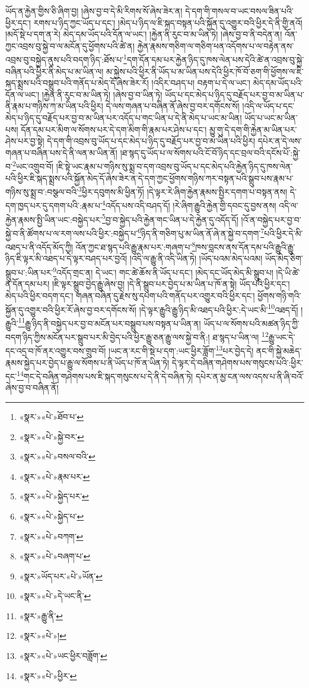 ཡོད་ན་རྐྱེན་གྱིས་ཅི་ཞིག་བྱ། །ཞེས་བྱ་བ་དེ་མི་རིགས་སོ་ཞེས་ཟེར་ན། དེ་དག་གི་གསལ་བ་ཡང་བསལ་ཟིན་པའི་ཕྱིར་དང་། རགས་པ་ཉིད་ཀྱང་ཡོད་པ་དང་། །མེད་པ་ཉིད་ལ་ཇི་སྐད་བསྟན་པའི་སྐྱོན་དུ་འགྱུར་བའི་ཕྱིར་དེ་ནི་གྱི་ནའོ། །མདོ་སྡེ་པ་དག་ན་རེ། མེད་དམ་ཡོད་པའི་དོན་ལ་ཡང་། །རྐྱེན་ནི་རུང་བ་མ་ཡིན་ཏེ། །ཞེས་བྱ་བ་ནི་བདེན་ན། འོན་ཀྱང་འབྲས་བུ་སྐྱེ་བ་ལ་མངོན་དུ་ཕྱོགས་པའི་ཚེ་ན། རྐྱེན་རྣམས་གཅིག་ལ་གཅིག་ཕན་འདོགས་པ་ལ་བརྟེན་ནས་འབྲས་བུ་བསྐྱེད་ནུས་པའི་བདག་ཉིད་:ཐོས་པ་\footnote{«སྣར་»«པེ་»ཐོབ་པ་}དག་དོན་དམ་པར་རྐྱེན་ཉིད་དུ་ཁས་ལེན་པས་དེའི་ཚེ་ན་འབྲས་བུ་སྐྱེ་བཞིན་པའི་ཕྱིར་ནི་མེད་པ་མ་ཡིན་ལ། མ་སྐྱེས་པའི་ཕྱིར་ནི་ཡོད་པ་མ་ཡིན་པས་དེའི་ཕྱིར་ཁོ་བོ་ཅག་གི་ཕྱོགས་ལ་ཇི་སྐད་སྨྲས་པའི་བསྒྲུབ་པའི་གནོད་པ་མེད་དོ་ཞེས་ཟེར་རོ། །འདིར་བཤད་པ། བརྟག་པ་དེ་ལ་ཡང་། མེད་དམ་ཡོད་པའི་དོན་ལ་ཡང་། །རྐྱེན་ནི་རུང་བ་མ་ཡིན་ཏེ། །ཞེས་བྱ་བ་ཡིན་ཏེ། ཡོད་པ་དང་མེད་པ་ཉིད་དུ་བརྗོད་པར་བྱ་བ་མ་ཡིན་པ་ནི་རྣམ་པ་གཉིས་ཀ་མ་ཡིན་པའི་ཕྱིར། དེ་ལས་གཞན་པ་བཞིན་ནོ་ཞེས་བྱ་བར་དགོངས་སོ། །འདི་ལ་ཡོད་པ་དང་མེད་པ་ཉིད་དུ་བརྗོད་པར་བྱ་བ་མ་ཡིན་པར་འདོད་པ་གང་ཡིན་པ་དེ་ནི་མེད་པ་ཡང་མ་ཡིན། ཡོད་པ་ཡང་མ་ཡིན་པས། དོན་དམ་པར་མིག་ལ་སོགས་པར་དེ་དག་མིག་གི་རྣམ་པར་ཤེས་པ་དང་། མྱུ་གུ་དེ་དག་གི་རྐྱེན་མ་ཡིན་པར་ཤེས་པར་བྱ་སྟེ། དེ་དག་གི་འབྲས་བུ་ཡོད་པ་དང་མེད་པ་ཉིད་དུ་བརྗོད་པར་བྱ་བ་མ་ཡིན་པའི་ཕྱིར། དཔེར་ན་དེ་ལས་གཞན་པ་བཞིན་པས་དེ་ནི་ལན་མ་ཡིན་ནོ། །ཐ་སྙད་དུ་ཡོད་པ་ལ་སོགས་པའི་ངོ་བོ་ཉིད་དང་བྲལ་བའི་དངོས་པོ་:སྐྱེ་བ་\footnote{«སྣར་»«པེ་»སྐྱེ་བར་}ཡང་འགྲུབ་བོ། །ཇི་སྟེ་ཡང་རྣམ་པ་གཉིས་སུ་སྨྲ་བ་དག་འབྲས་བུ་ཡོད་པ་དང་མེད་པའི་རྐྱེན་ཉིད་དུ་ཁས་ལེན་པའི་ཕྱིར་ཇི་སྐད་སྨྲས་པའི་སྐྱོན་མེད་དོ་ཞེས་ཟེར་ན་དེ་དག་ཀྱང་ཕྱོགས་གཉིས་ཀར་བསྟན་པའི་སྒྲུབ་པས་རྣམ་པ་གཉིས་སུ་སྨྲ་བ་:བསྩལ་བའི་\footnote{«སྣར་»«པེ་»བསལ་བའི་}ཕྱིར་དབུགས་མི་ཕྱིན་ཏོ། །དེ་ལྟར་རེ་ཞིག་རྐྱེན་རྣམས་སྤྱིར་དགག་པ་བསྟན་ནས། དེ་དག་ཁྱད་པར་དུ་དགག་པའི་:རྣམ་པ་\footnote{«སྣར་»«པེ་»རྣམ་པར་}འདོད་པས་འདི་བཤད་དོ། །རེ་ཞིག་རྒྱུའི་རྐྱེན་གྱི་དབང་དུ་བྱས་ནས། འདི་ལ་རྐྱེན་རྣམས་སྤྱི་ཡིན་ཡང་:བསྐྱེད་པར་\footnote{«སྣར་»«པེ་»སྐྱེད་པར་}བྱ་བ་སྐྱེད་པའི་རྐྱེན་གང་ཡིན་པ་དེ་རྐྱེན་དུ་འདོད་དོ། །འོ་ན་བསྐྱེད་པར་བྱ་བ་སྐྱེ་བ་ནི་ཚོགས་པ་ལ་རག་ལས་པའི་ཕྱིར་:བསྐྱེད་པ་\footnote{«སྣར་»«པེ་»སྐྱེད་པ་}ཉིད་ནི་གཅིག་པུ་མ་ཡིན་ནོ་ཞེ་ན་སྐྱེ་བ་དགག་\footnote{«སྣར་»«པེ་»བཀག་}པའི་ཕྱིར་དེ་མི་འཐད་པ་ནི་འདོད་མོད་ཀྱི། འོན་ཀྱང་ཐ་སྙད་པའི་རྒྱུ་རྣམ་པར་:གཞག་པ་\footnote{«སྣར་»«པེ་»བཞག་པ་}ཁས་བླངས་ནས་དོན་དམ་པའི་རྒྱུའི་རྒྱུ་ཉིད་ཇི་ལྟར་མི་འཐད་པ་དེ་ལྟར་བཤད་པར་བྱའོ། །འདི་ལ་རྒྱུ་ནི་འདི་ཡིན་ཏེ། །ཡོད་པའམ་མེད་པའམ། ཡོད་མེད་ཅིག་སྒྲུབ་པ་:ཡིན་པར་\footnote{«སྣར་»ཡོད་པར་«པེ་»ཡོན་}འདོད་གྲང་ན། དེ་ཡང་། གང་ཚེ་ཆོས་ནི་ཡོད་པ་དང་། །མེད་དང་ཡོད་མེད་མི་སྒྲུབ་པ། །དེ་ཡི་ཚེ་ན་དོན་དམ་པར། །ཇི་ལྟར་སྒྲུབ་བྱེད་རྒྱུ་ཞེས་བྱ། །དེ་ནི་སྒྲུབ་པར་བྱེད་པ་མ་ཡིན་པ་ཁོ་ན་སྟེ། ཡོད་པའི་ཕྱིར་དང་། མེད་པའི་ཕྱིར་བདག་དང་། གཞན་བཞིན་དུ་རྗེས་སུ་དཔག་པའི་གནོད་པར་འགྱུར་བའི་ཕྱིར་དང་། ཕྱོགས་གཉི་གའི་སྐྱོན་དུ་འགྱུར་བའི་ཕྱིར་རོ་ཞེས་བྱ་བར་དགོངས་སོ། །དེ་ལྟར་རྒྱུའི་རྒྱུ་ཉིད་མི་འཐད་པའི་ཕྱིར་:དེ་ཡང་མི་\footnote{«སྣར་»«པེ་»དེ་ཡང་ནི་}འཐད་དོ། །རྒྱུའི་\footnote{«སྣར་»རྒྱུ་ནི་}རྒྱུ་ཉིད་ནི་བསྐྱེད་པར་བྱ་བ་མངོན་པར་བསྒྲུབ་པས་བསྟན་པ་ཡིན་ན། ཡོད་པ་ལ་སོགས་པའི་མཚན་ཉིད་ཀྱི་བདག་ཉིད་ཀྱིས་མངོན་པར་སྒྲུབ་པར་མི་བྱེད་པའི་ཕྱིར་རྒྱུ་ཅན་རྒྱུ་ལས་སྐྱེ་བ་ནི:། ཐ་སྙད་པ་ཡིན་ལ། \footnote{«སྣར་»«པེ་»།  }རྒྱུ་ཡང་དེ་དང་འདྲ་བ་ཁོ་ནར་འགྱུར་བས་གྲུབ་བོ། །ཡང་ན་རང་གི་སྡེ་པ་དག་:ཡང་ཕྱིར་ཟློག་\footnote{«སྣར་»«པེ་»ཡང་ཕྱིར་བཟློག་}པར་བྱེད་དེ། ནང་གི་སྐྱེ་མཆེད་རྣམས་སྐྱེད་པར་བྱེད་པ་རྒྱུ་ལ་སོགས་པ་ནི་ཡོད་པ་ཁོ་ན་ཡིན་ཏེ། དེ་ལྟར་དེ་བཞིན་གཤེགས་པས་གསུངས་པའི་:ཕྱིར་དང་\footnote{«སྣར་»«པེ་»ཕྱིར་}གང་དེ་བཞིན་གཤེགས་པས་ཇི་སྐད་གསུངས་པ་དེ་ནི་དེ་བཞིན་ཏེ། དཔེར་ན་མྱ་ངན་ལས་འདས་པ་ནི་ཞི་བའོ་ཞེས་བྱ་བ་བཞིན་ནོ། 
